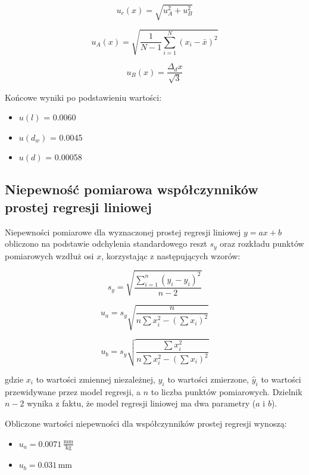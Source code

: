 \documentclass[a4paper,12pt]{article}
\begin{document}
\begin{equation}
\label{eq:u_c}
u_c(x) = \sqrt{u_A^2 + u_B^2}
\end{equation}

\begin{equation}
\label{eq:u_A}
u_A(x) = \sqrt{\frac{1}{N-1} \sum_{i=1}^{N} (x_i - \bar{x})^2}
\end{equation}

\begin{equation}
\label{eq:u_B}
u_B(x) = \frac{\Delta_d x}{\sqrt{3}}
\end{equation}

Końcowe wyniki po podstawieniu wartości:

\begin{itemize}
\item $u(l)$ = 0.0060\,
\item $u(d_w)$ = 0.0045 
\item $u(d)$ = 0.00058\,
\end{itemize}

\subsection{Niepewność pomiarowa współczynników prostej regresji liniowej}

Niepewności pomiarowe dla wyznaczonej prostej regresji liniowej $y = ax + b$ obliczono na podstawie odchylenia standardowego reszt $s_y$ oraz rozkładu punktów pomiarowych wzdłuż osi $x$, korzystając z następujących wzorów:

\[
s_y = \sqrt{\frac{\sum_{i=1}^{n} (y_i - \hat{y}_i)^2}{n-2}}
\]

\[
u_a = s_y \sqrt{\frac{n}{n \sum x_i^2 - \left( \sum x_i \right)^2}}
\]

\[
u_b = s_y \sqrt{\frac{\sum x_i^2}{n \sum x_i^2 - \left( \sum x_i \right)^2}}
\]

gdzie $x_i$ to wartości zmiennej niezależnej, $y_i$ to wartości zmierzone, $\hat{y}_i$ to wartości przewidywane przez model regresji, a $n$ to liczba punktów pomiarowych. Dzielnik $n-2$ wynika z faktu, że model regresji liniowej ma dwa parametry ($a$ i $b$).


Obliczone wartości niepewności dla współczynników prostej regresji wynoszą:

\begin{itemize}
    \item $u_a = 0.0071\,\frac{\text{mm}}{\text{kg}}$
    \item $u_b = 0.031\,\text{mm}$
\end{itemize}
\end{document}

